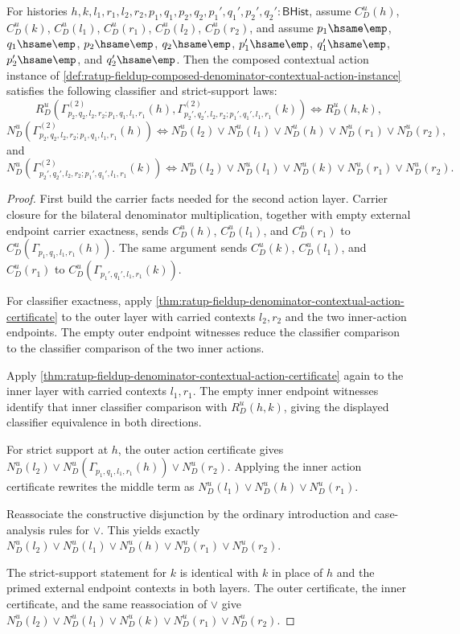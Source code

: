 \begin{theorem}
\label{thm:ratup-fieldup-denominator-contextual-action-composition}
For histories
$h,k,l_1,r_1,l_2,r_2,p_1,q_1,p_2,q_2,p_1',q_1',p_2',q_2':\mathsf{BHist}$,
assume $C_D^u(h)$, $C_D^u(k)$, $C_D^u(l_1)$, $C_D^u(r_1)$, $C_D^u(l_2)$,
$C_D^u(r_2)$, and assume
$p_1\hsame\emp$, $q_1\hsame\emp$, $p_2\hsame\emp$, $q_2\hsame\emp$,
$p_1'\hsame\emp$, $q_1'\hsame\emp$, $p_2'\hsame\emp$, and
$q_2'\hsame\emp$. Then the composed contextual action instance of
\autoref{def:ratup-fieldup-composed-denominator-contextual-action-instance}
satisfies the following classifier and strict-support laws:
$$
R_D^u(
\Gamma^{(2)}_{p_2,q_2,l_2,r_2;p_1,q_1,l_1,r_1}(h),
\Gamma^{(2)}_{p_2',q_2',l_2,r_2;p_1',q_1',l_1,r_1}(k))
\Longleftrightarrow
R_D^u(h,k),
$$
$$
N_D^u(\Gamma^{(2)}_{p_2,q_2,l_2,r_2;p_1,q_1,l_1,r_1}(h))
\Longleftrightarrow
N_D^u(l_2)\lor N_D^u(l_1)\lor N_D^u(h)\lor N_D^u(r_1)\lor N_D^u(r_2),
$$
and
$$
N_D^u(\Gamma^{(2)}_{p_2',q_2',l_2,r_2;p_1',q_1',l_1,r_1}(k))
\Longleftrightarrow
N_D^u(l_2)\lor N_D^u(l_1)\lor N_D^u(k)\lor N_D^u(r_1)\lor N_D^u(r_2).
$$
\end{theorem}
\begin{proof}
First build the carrier facts needed for the second action layer. Carrier
closure for the bilateral denominator multiplication, together with empty
external endpoint carrier exactness, sends $C_D^u(h)$, $C_D^u(l_1)$, and
$C_D^u(r_1)$ to $C_D^u(\Gamma_{p_1,q_1,l_1,r_1}(h))$. The same argument sends
$C_D^u(k)$, $C_D^u(l_1)$, and $C_D^u(r_1)$ to
$C_D^u(\Gamma_{p_1',q_1',l_1,r_1}(k))$.

For classifier exactness, apply
\autoref{thm:ratup-fieldup-denominator-contextual-action-certificate} to the
outer layer with carried contexts $l_2,r_2$ and the two inner-action endpoints.
The empty outer endpoint witnesses reduce the classifier comparison to the
classifier comparison of the two inner actions.

Apply
\autoref{thm:ratup-fieldup-denominator-contextual-action-certificate} again to
the inner layer with carried contexts $l_1,r_1$. The empty inner endpoint
witnesses identify that inner classifier comparison with $R_D^u(h,k)$, giving
the displayed classifier equivalence in both directions.

For strict support at $h$, the outer action certificate gives
$N_D^u(l_2)\lor N_D^u(\Gamma_{p_1,q_1,l_1,r_1}(h))\lor N_D^u(r_2)$. Applying
the inner action certificate rewrites the middle term as
$N_D^u(l_1)\lor N_D^u(h)\lor N_D^u(r_1)$.

Reassociate the constructive disjunction by the ordinary introduction and
case-analysis rules for $\lor$. This yields exactly
$N_D^u(l_2)\lor N_D^u(l_1)\lor N_D^u(h)\lor N_D^u(r_1)\lor N_D^u(r_2)$.

The strict-support statement for $k$ is identical with $k$ in place of $h$ and
the primed external endpoint contexts in both layers. The outer certificate,
the inner certificate, and the same reassociation of $\lor$ give
$N_D^u(l_2)\lor N_D^u(l_1)\lor N_D^u(k)\lor N_D^u(r_1)\lor N_D^u(r_2)$.
\end{proof}

